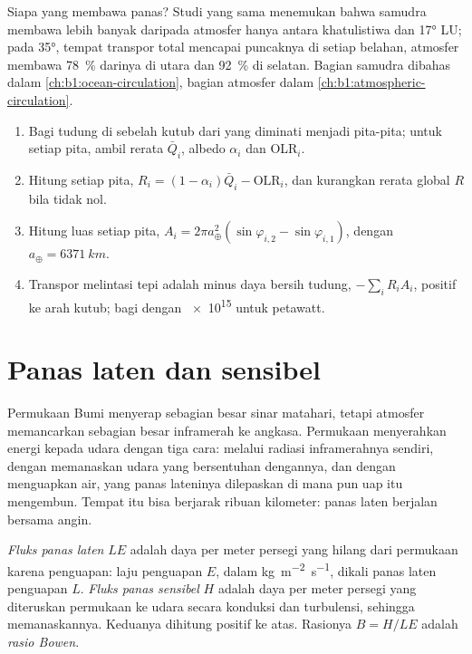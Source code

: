 Siapa yang membawa panas? Studi yang sama menemukan bahwa samudra membawa lebih banyak daripada atmosfer hanya antara khatulistiwa dan \ang{17} LU; pada \ang{35}, tempat transpor total mencapai puncaknya di setiap belahan, atmosfer membawa \qty{78}{\percent} darinya di utara dan \qty{92}{\percent} di selatan. Bagian samudra dibahas dalam \cref{ch:b1:ocean-circulation}, bagian atmosfer dalam \cref{ch:b1:atmospheric-circulation}.

\begin{method}\label{met:b1:radiation-heat-transport:bands}
\begin{enumerate}
  \item Bagi tudung di sebelah kutub dari  yang diminati menjadi pita-pita; untuk setiap pita, ambil rerata  $\bar Q_i$, albedo $\alpha_i$ dan OLR$_i$.
  \item Hitung  setiap pita, $R_i = (1 - \alpha_i)\bar Q_i -
        \text{OLR}_i$, dan kurangkan rerata global $R$ bila tidak nol.
  \item Hitung luas setiap pita, $A_i = 2\pi a_\oplus^2(\sin\varphi_{i,2} -
        \sin\varphi_{i,1})$, dengan $a_\oplus = \qty{6371}{km}$.
  \item Transpor melintasi tepi adalah minus daya bersih tudung, $-\sum_i R_i A_i$, positif ke arah kutub; bagi dengan \num{e15} untuk petawatt.
\end{enumerate}
\end{method}

\section{Panas laten dan sensibel}\label{sec:b1:radiation-heat-transport:latent}

Permukaan Bumi menyerap sebagian besar sinar matahari, tetapi atmosfer memancarkan sebagian besar inframerah ke angkasa. Permukaan menyerahkan energi kepada udara dengan tiga cara: melalui radiasi inframerahnya sendiri, dengan memanaskan udara yang bersentuhan dengannya, dan dengan menguapkan air, yang panas lateninya dilepaskan di mana pun uap itu mengembun. Tempat itu bisa berjarak ribuan kilometer: panas laten berjalan bersama angin.

\begin{definition}\label{def:b1:radiation-heat-transport:surface-fluxes}
\emph{Fluks panas laten} $LE$ adalah daya per meter persegi yang hilang dari permukaan karena penguapan: laju penguapan $E$, dalam
\unit{kg.m^{-2}.s^{-1}}, dikali panas laten penguapan $L$. \emph{Fluks panas sensibel} $H$ adalah daya per meter persegi yang diteruskan permukaan ke udara secara konduksi dan turbulensi, sehingga memanaskannya. Keduanya dihitung positif ke atas. Rasionya $B = H/LE$ adalah \emph{rasio Bowen}.
\end{definition}

